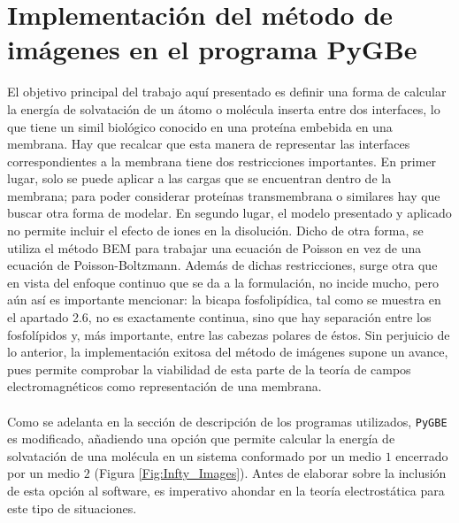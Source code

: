 \documentclass[12pt, oneside, numbers, spanish]{ezthesis}
\numberwithin{equation}{section}
\begin{document}
\section{Implementación del método de imágenes en el programa PyGBe}\label{Sec:Implementation}
El objetivo principal del trabajo aquí presentado es definir una forma de calcular la energía de solvatación de un átomo o molécula inserta entre dos interfaces, lo que tiene un simil biológico conocido en una proteína embebida en una membrana. Hay que recalcar que esta manera de representar las interfaces correspondientes a la membrana tiene dos restricciones importantes. En primer lugar, solo se puede aplicar a las cargas que se encuentran dentro de la membrana; para poder considerar proteínas transmembrana o similares hay que buscar otra forma de modelar. En segundo lugar, el modelo presentado y aplicado no permite incluir el efecto de iones en la disolución. Dicho de otra forma, se utiliza el método BEM para trabajar una ecuación de Poisson en vez de una ecuación de Poisson-Boltzmann. Además de dichas restricciones, surge otra que en vista del enfoque continuo que se da a la formulación, no incide mucho, pero aún así es importante mencionar: la bicapa fosfolipídica, tal como se muestra en el apartado 2.6, no es exactamente continua, sino que hay separación entre los fosfolípidos y, más importante, entre las cabezas polares de éstos. Sin perjuicio de lo anterior, la implementación exitosa del método de imágenes supone un avance, pues permite comprobar la viabilidad de esta parte de la teoría de campos electromagnéticos como representación de una membrana.\\\\
Como se adelanta en la sección de descripción de los programas utilizados, \texttt{PyGBE} es modificado, añadiendo una opción que permite calcular la energía de solvatación de una molécula en un sistema conformado por un medio $1$ encerrado por un medio $2$ (Figura \ref{Fig:Infty_Images}). Antes de elaborar sobre la inclusión de esta opción al software, es imperativo ahondar en la teoría electrostática para este tipo de situaciones.
\end{document}
